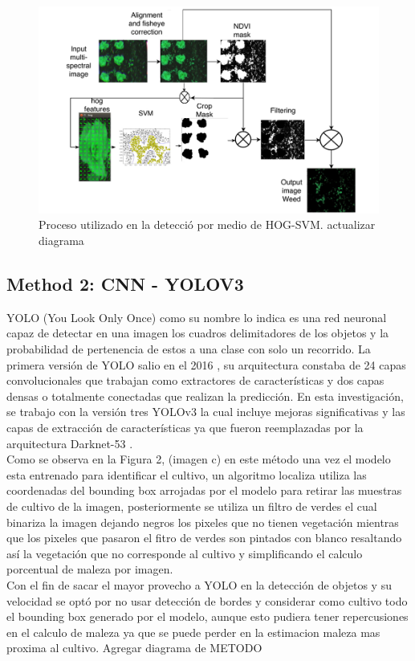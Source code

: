 \documentclass[journal,article,submit,moreauthors,pdftex]{Definitions/mdpi}
\begin{document}
\begin{figure}[H]
    \centering
    \includegraphics[scale=0.5]{svm_process}
     \centering
    \caption{Proceso utilizado en la detecció por medio de HOG-SVM. \label{fig:svm_process}\textcolor{correccion}{actualizar diagrama } }
\end{figure}

\subsection{Method 2: CNN - YOLOV3}
YOLO (You Look Only Once) como su nombre lo indica es una red neuronal capaz de detectar en una imagen los cuadros delimitadores de los objetos y la probabilidad de pertenencia de estos a una clase con solo un recorrido. La primera versión de YOLO salio en el 2016 \cite{c51}, su arquitectura constaba de 24 capas convolucionales que trabajan como extractores de características y dos capas densas o totalmente conectadas que realizan la predicción. En esta investigación, se trabajo con la versión tres YOLOv3 \cite{c53} la cual incluye mejoras significativas y las capas de extracción de características ya que fueron reemplazadas por la arquitectura Darknet-53 \cite{c53}.
\\
Como se observa en la Figura 2, (imagen c) en este método una vez el modelo esta entrenado para identificar el cultivo, un algoritmo localiza utiliza las coordenadas del bounding box arrojadas por el modelo para retirar las muestras de cultivo de la imagen, posteriormente se utiliza un filtro de verdes el cual binariza la imagen dejando negros los pixeles que no tienen vegetación mientras que los pixeles que pasaron el fitro de verdes son pintados con blanco resaltando así la vegetación que no corresponde al cultivo y simplificando el calculo porcentual de maleza por imagen.
\\
Con el fin de sacar el mayor provecho a YOLO en la detección de objetos y su velocidad se optó por no usar detección de bordes y  considerar como cultivo todo el bounding box generado por el modelo, aunque esto pudiera tener repercusiones en el calculo de maleza ya que se puede perder en la estimacion maleza mas proxima al cultivo.
\textcolor{correccion}{Agregar diagrama de METODO}
\end{document}
